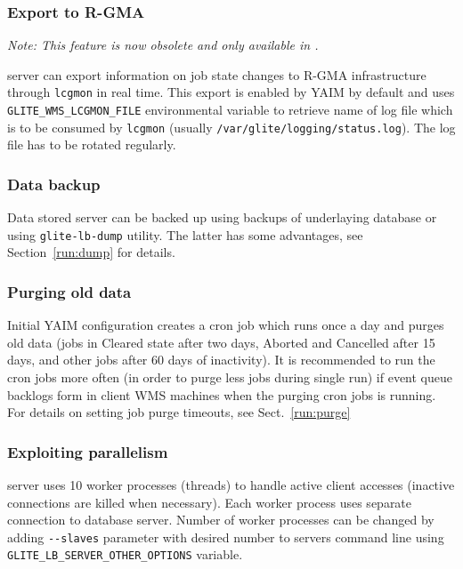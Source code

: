 
\subsubsection{Export to R-GMA}

\emph{Note: This feature is now obsolete and only available in .}

{\sloppy
\LB server can export information on job state changes to R-GMA infrastructure through \verb'lcgmon' 
in real time. This export is enabled by YAIM by default and uses \verb'GLITE_WMS_LCGMON_FILE' 
environmental variable to retrieve name of log file which is to be consumed by \verb'lcgmon' (usually
\verb'/var/glite/logging/status.log'). The log file has to be rotated regularly.

}

\subsubsection{Data backup}
\label{inst:backup}

Data stored \LB server can be backed up using backups of underlaying database or using \verb'glite-lb-dump' utility.
The latter has some advantages, see Section~\ref{run:dump} for details.

\subsubsection{Purging old data}
\label{inst:purge}

Initial YAIM configuration creates a cron job which runs once a day and purges old 
data (jobs in Cleared state after two days, Aborted and Cancelled after 15 days, and other jobs 
after 60 days of inactivity). It is recommended to run the cron jobs more often (in order to purge less jobs
during single run) if event queue backlogs form in client WMS machines when the purging cron jobs is running.
For details on setting job purge timeouts, see Sect.~\ref{run:purge}


\subsubsection{Exploiting parallelism}

\LB server uses 10 worker processes (threads) to handle active client accesses (inactive connections are killed
when necessary). Each worker process uses separate connection to database server. Number of worker processes 
can be changed by adding \verb'--slaves' parameter with desired number to servers command line
using \verb'GLITE_LB_SERVER_OTHER_OPTIONS' variable.

